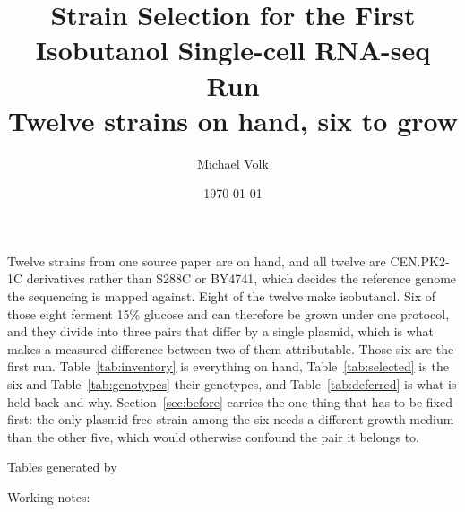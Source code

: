\documentclass[10pt,a4paper]{article}
\title{\vspace{-1.5em}Strain Selection for the First Isobutanol
  Single-cell RNA-seq Run\\
  {\large Twelve strains on hand, six to grow}}
\author{Michael Volk}
\date{\today}
\begin{document}
\maketitle
\thispagestyle{empty}

\noindent
Twelve strains from one source paper are on hand, and all twelve are
 CEN.PK2-1C derivatives rather than S288C or
BY4741, which decides the reference genome the sequencing is mapped against.
Eight of the twelve make isobutanol. Six of those eight ferment 15\% glucose and
can therefore be grown under one protocol, and they divide into three pairs that
differ by a single plasmid, which is what makes a measured difference between
two of them attributable. Those six are the first run.
Table~\ref{tab:inventory} is everything on hand,
Table~\ref{tab:selected} is the six and
Table~\ref{tab:genotypes} their genotypes, and
Table~\ref{tab:deferred} is what is held back and why.
Section~\ref{sec:before} carries the one thing that has to be fixed first: the
only plasmid-free strain among the six needs a different growth medium than the
other five, which would otherwise confound the pair it belongs to.

\vspace{0.5em}
{\small\color{tcgray}
Tables generated by \par
Working notes: \par}

\vspace{1em}
\tccontents






\end{document}
